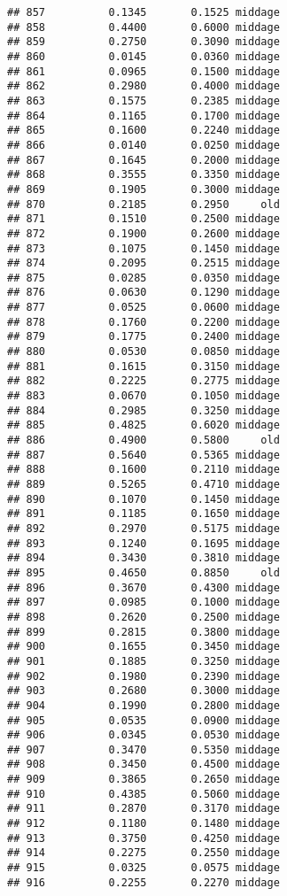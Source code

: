 \documentclass[
]{article}
\begin{document}
\begin{verbatim}
## 857          0.1345       0.1525 middage
## 858          0.4400       0.6000 middage
## 859          0.2750       0.3090 middage
## 860          0.0145       0.0360 middage
## 861          0.0965       0.1500 middage
## 862          0.2980       0.4000 middage
## 863          0.1575       0.2385 middage
## 864          0.1165       0.1700 middage
## 865          0.1600       0.2240 middage
## 866          0.0140       0.0250 middage
## 867          0.1645       0.2000 middage
## 868          0.3555       0.3350 middage
## 869          0.1905       0.3000 middage
## 870          0.2185       0.2950     old
## 871          0.1510       0.2500 middage
## 872          0.1900       0.2600 middage
## 873          0.1075       0.1450 middage
## 874          0.2095       0.2515 middage
## 875          0.0285       0.0350 middage
## 876          0.0630       0.1290 middage
## 877          0.0525       0.0600 middage
## 878          0.1760       0.2200 middage
## 879          0.1775       0.2400 middage
## 880          0.0530       0.0850 middage
## 881          0.1615       0.3150 middage
## 882          0.2225       0.2775 middage
## 883          0.0670       0.1050 middage
## 884          0.2985       0.3250 middage
## 885          0.4825       0.6020 middage
## 886          0.4900       0.5800     old
## 887          0.5640       0.5365 middage
## 888          0.1600       0.2110 middage
## 889          0.5265       0.4710 middage
## 890          0.1070       0.1450 middage
## 891          0.1185       0.1650 middage
## 892          0.2970       0.5175 middage
## 893          0.1240       0.1695 middage
## 894          0.3430       0.3810 middage
## 895          0.4650       0.8850     old
## 896          0.3670       0.4300 middage
## 897          0.0985       0.1000 middage
## 898          0.2620       0.2500 middage
## 899          0.2815       0.3800 middage
## 900          0.1655       0.3450 middage
## 901          0.1885       0.3250 middage
## 902          0.1980       0.2390 middage
## 903          0.2680       0.3000 middage
## 904          0.1990       0.2800 middage
## 905          0.0535       0.0900 middage
## 906          0.0345       0.0530 middage
## 907          0.3470       0.5350 middage
## 908          0.3450       0.4500 middage
## 909          0.3865       0.2650 middage
## 910          0.4385       0.5060 middage
## 911          0.2870       0.3170 middage
## 912          0.1180       0.1480 middage
## 913          0.3750       0.4250 middage
## 914          0.2275       0.2550 middage
## 915          0.0325       0.0575 middage
## 916          0.2255       0.2270 middage

\end{verbatim}
\end{document}
